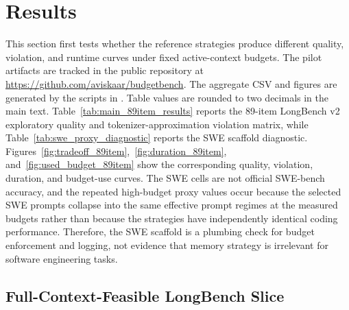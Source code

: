 \documentclass[11pt]{article}
\newcommand{\RepoURL}{\url{https://github.com/aviskaar/budgetbench}}
\begin{document}
\section{Results}

This section first tests whether the reference strategies produce different
quality, violation, and runtime curves under fixed active-context budgets.  The
pilot artifacts are tracked in the public repository at \RepoURL{}.  The
aggregate CSV and figures are generated by the scripts in .
Table values are rounded to two decimals in the main text.  Table~\ref{tab:main_89item_results}
reports the 89-item LongBench v2 exploratory quality and tokenizer-approximation
violation matrix, while
Table~\ref{tab:swe_proxy_diagnostic} reports the SWE scaffold diagnostic.
Figures~\ref{fig:tradeoff_89item},~\ref{fig:duration_89item}, and~\ref{fig:used_budget_89item}
show the corresponding quality, violation,
duration, and budget-use curves.  The SWE cells are not official SWE-bench
accuracy, and the repeated high-budget proxy values occur because the selected
SWE prompts collapse into the same effective prompt regimes at the measured
budgets rather than because the strategies have independently identical coding
performance.  Therefore, the SWE scaffold is a plumbing check for budget
enforcement and logging, not evidence that memory strategy is irrelevant for
software engineering tasks.



\subsection{Full-Context-Feasible LongBench Slice}
\end{document}
